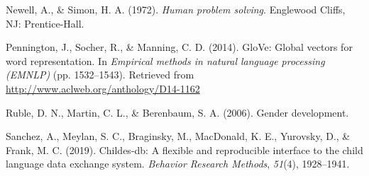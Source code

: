 \documentclass[10pt, letterpaper]{article}
\newenvironment{CSLReferences}%
  {}%
  {\par}
\begin{document}
\begin{CSLReferences}{1}{0}
\leavevmode{}%
Newell, A., \& Simon, H. A. (1972). \emph{Human problem solving}.
Englewood Cliffs, NJ: Prentice-Hall.

\leavevmode{}%
Pennington, J., Socher, R., \& Manning, C. D. (2014). GloVe: Global
vectors for word representation. In \emph{Empirical methods in natural
language processing (EMNLP)} (pp. 1532--1543). Retrieved from
\url{http://www.aclweb.org/anthology/D14-1162}

\leavevmode{}%
Ruble, D. N., Martin, C. L., \& Berenbaum, S. A. (2006). Gender
development.

\leavevmode{}%
Sanchez, A., Meylan, S. C., Braginsky, M., MacDonald, K. E., Yurovsky,
D., \& Frank, M. C. (2019). Childes-db: A flexible and reproducible
interface to the child language data exchange system. \emph{Behavior
Research Methods}, \emph{51}(4), 1928--1941.

\end{CSLReferences}


\end{document}
